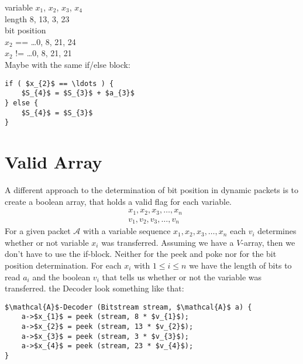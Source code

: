 \documentclass[parskip=full,paper=a4,DIV=12]{scrartcl}
\begin{document}
variable   $x_{1}$, $x_{2}$, $x_{3}$, $x_{4}$\\
length        8, 13, 3, 23\\
bit position\\
$x_{2}$ == \ldots  0, 8, 21, 24\\
$x_{2}$ != \ldots  0, 8, 21, 21\\

Maybe with the same if/else block:

\begin{lstlisting}[mathescape]
if ( $x_{2}$ == \ldots ) {
	$S_{4}$ = $S_{3}$ + $a_{3}$
} else {
	$S_{4}$ = $S_{3}$
}
\end{lstlisting}

\section{Valid Array}

A different approach to the determination of bit position in dynamic packets is to create a boolean array, that holds a valid flag for each variable.
\begin{align*}
	&x_{1}, x_{2}, x_{3}, \ldots , x_{n}\\
	&v_{1}, v_{2}, v_{3}, \ldots , v_{n}	
\end{align*}
For a given packet $\mathcal{A}$ with a variable sequence $x_{1}, x_{2}, x_{3}, \ldots , x_{n}$ each $v_{i}$ determines whether or not variable $x_{i}$ was transferred.
Assuming we have a $V$-array, then we don't have to use the if-block.
Neither for the peek and poke nor for the bit position determination.
For each $x_{i}$ with $1\leq i\leq n$ we have the length of bits to read $a_{i}$ and the boolean $v_{i}$ that tells us whether or not the variable was transferred.
the Decoder look something like that:
\begin{lstlisting}[mathescape]
$\mathcal{A}$-Decoder (Bitstream stream, $\mathcal{A}$ a) {
	a->$x_{1}$ = peek (stream, 8 * $v_{1}$);
	a->$x_{2}$ = peek (stream, 13 * $v_{2}$);
	a->$x_{3}$ = peek (stream, 3 * $v_{3}$);
	a->$x_{4}$ = peek (stream, 23 * $v_{4}$);
}
\end{lstlisting}
\end{document}
